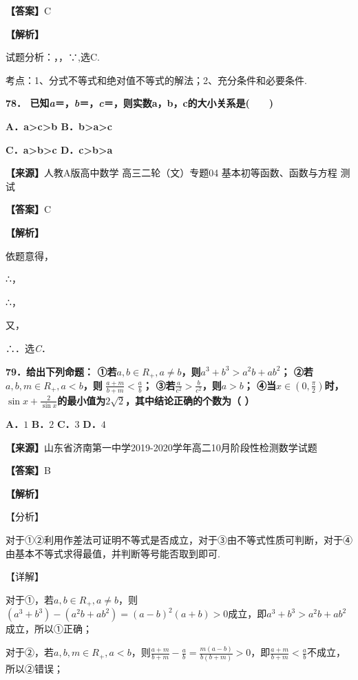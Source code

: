 \documentclass[
]{article}
\begin{document}
\textbf{【答案】}C

\textbf{【解析】}

试题分析：，，∵,选C.

考点：1、分式不等式和绝对值不等式的解法；2、充分条件和必要条件.

\textbf{78．
已知\emph{a}＝，\emph{b}＝，\emph{c}＝，则实数a，b，c的大小关系是(　　)}

\textbf{A．a\textgreater c\textgreater b
B．b\textgreater a\textgreater c}

\textbf{C．a\textgreater b\textgreater c
D．c\textgreater b\textgreater a}

\textbf{【来源】}人教A版高中数学 高三二轮（文）专题04
基本初等函数、函数与方程 测试

\textbf{【答案】}C

\textbf{【解析】}

依题意得，

∴，

∴，

又，

∴．选\emph{C}．

\textbf{79．给出下列命题：
①若}\(a,b \in R_{+},a \neq b\)\textbf{，则}\(a^{3} + b^{3} > a^{2}b + ab^{2}\)\textbf{；
②若}\(a,b,m \in R_{+},a < b\)\textbf{，则}
\(\frac{a + m}{b + m} < \frac{a}{b}\)\textbf{；
③若}\(\frac{a}{c^{2}} > \frac{b}{c^{2}}\)\textbf{，则}\(a > b\)\textbf{；
④当}\(x \in \left( 0,\frac{\pi}{2} \right)\)\textbf{时，}\(\sin x + \frac{2}{\sin x}\)\textbf{的最小值为}\(2\sqrt{2}\)\textbf{，其中结论正确的个数为（
）}

\textbf{A．}\(1\) \textbf{B．}\(2\) \textbf{C．}\(3\) \textbf{D．}\(4\)

\textbf{【来源】}山东省济南第一中学2019-2020学年高二10月阶段性检测数学试题

\textbf{【答案】}B

\textbf{【解析】}

【分析】

对于①②利用作差法可证明不等式是否成立，对于③由不等式性质可判断，对于④由基本不等式求得最值，并判断等号能否取到即可.

【详解】

对于①，若\(a,b \in R_{+},a \neq b\)，则\(\left( a^{3} + b^{3} \right) - \left( a^{2}b + ab^{2} \right) = \left( a - b \right)^{2}\left( a + b \right) > 0\)成立，即\(a^{3} + b^{3} > a^{2}b + ab^{2}\)成立，所以①正确；

对于②，若\(a,b,m \in R_{+},a < b\)，则\(\frac{a + m}{b + m} - \frac{a}{b} = \frac{m\left( a - b \right)}{b\left( b + m \right)} > 0\)，即\(\frac{a + m}{b + m} < \frac{a}{b}\)不成立，所以②错误；
\end{document}
